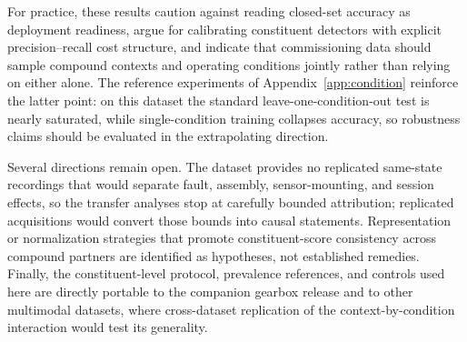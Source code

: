 For practice, these results caution against reading closed-set accuracy as
deployment readiness, argue for calibrating constituent detectors with
explicit precision--recall cost structure, and indicate that commissioning
data should sample compound contexts and operating conditions jointly
rather than relying on either alone. The reference experiments of
Appendix~\ref{app:condition} reinforce the latter point: on this dataset
the standard leave-one-condition-out test is nearly saturated, while
single-condition training collapses accuracy, so robustness claims should
be evaluated in the extrapolating direction.

Several directions remain open. The dataset provides no replicated
same-state recordings that would separate fault, assembly, sensor-mounting,
and session effects, so the transfer analyses stop at carefully bounded
attribution; replicated acquisitions would convert those bounds into causal
statements. Representation or normalization strategies that promote
constituent-score consistency across compound partners are identified as
hypotheses, not established remedies. Finally, the constituent-level
protocol, prevalence references, and controls used here are directly
portable to the companion gearbox release and to other multimodal datasets,
where cross-dataset replication of the context-by-condition interaction
would test its generality.
